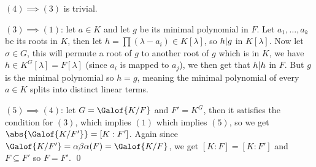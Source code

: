 $(4)\implies(3)$ is trivial.

$(3)\implies(1)$: let $a\in K$ and let $g$ be its minimal polynomial in $F$.
Let $a_1,\dots,a_k$ be its roots in $K$, then let $h=\prod(\lambda-a_i)\in K[\lambda]$, so $h{\mid} g$ in $K[\lambda]$.
Now let $\sigma\in G$, this will permute a root of $g$ to another root of $g$ which is in $K$, we have $h\in K^G[\lambda]=F[\lambda]$ (since $a_i$ is mapped to $a_j$), we then get that $h{\mid} h$ in $F$.
But $g$ is the minimal polynomial so $h=g$, meaning the minimal polynomial of every $a\in K$ splits into distinct linear terms.

$(5)\implies(4)$: let $G=\Galof{K/F}$ and $F'=K^G$, then it satisfies the condition for $(3)$, which implies $(1)$ which implies $(5)$, so we get $\abs{\Galof{K/F'}}=[K:F']$.
Again since $\Galof{K/F'}=\alpha\beta\alpha(F)=\Galof{K/F}$, we get $[K:F]=[K:F']$ and $F\subseteq F'$ so $F=F'$.
\qed

\bye

